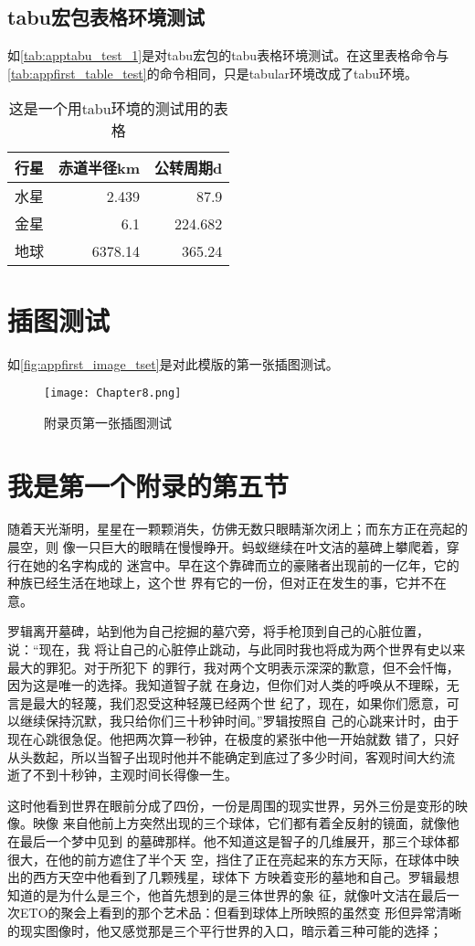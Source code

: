\subsection{tabu宏包表格环境测试}
如\autoref{tab:apptabu_test_1}是对tabu宏包的tabu表格环境测试。在这里表格命令与\autoref{tab:appfirst_table_test}的命令相同，只是tabular环境改成了tabu环境。
\begin{table}[htbp]
	\centering
	\caption{这是一个用tabu环境的测试用的表格}\label{tab:apptabu_test_1}
    \begin{tabu}{lrr}
    \toprule
    \textbf{行星}     & \textbf{赤道半径}km & \textbf{公转周期}d \\
    \midrule
    水星     & 2.439  & 87.9 \\
    金星     & 6.1    & 224.682 \\
    地球     & 6378.14 & 365.24 \\
    \bottomrule
    \end{tabu}%
\end{table}

\section{插图测试}
如\autoref{fig:appfirst_image_tset}是对此模版的第一张插图测试。

\begin{figure}[htbp]
	\centering
	\texttt{[image: Chapter8.png]}
	\caption{附录页第一张插图测试}\label{fig:appfirst_image_tset}
\end{figure}

\section{我是第一个附录的第五节}
随着天光渐明，星星在一颗颗消失，仿佛无数只眼睛渐次闭上；而东方正在亮起的晨空，则%
像一只巨大的眼睛在慢慢睁开。蚂蚁继续在叶文洁的墓碑上攀爬着，穿行在她的名字构成的%
迷宫中。早在这个靠碑而立的豪赌者出现前的一亿年，它的种族已经生活在地球上，这个世%
界有它的一份，但对正在发生的事，它并不在意。

罗辑离开墓碑，站到他为自己挖掘的墓穴旁，将手枪顶到自己的心脏位置，说：“现在，我
将让自己的心脏停止跳动，与此同时我也将成为两个世界有史以来最大的罪犯。对于所犯下
的罪行，我对两个文明表示深深的歉意，但不会忏悔，因为这是唯一的选择。我知道智子就
在身边，但你们对人类的呼唤从不理睬，无言是最大的轻蔑，我们忍受这种轻蔑已经两个世
纪了，现在，如果你们愿意，可以继续保持沉默，我只给你们三十秒钟时间。”罗辑按照自
己的心跳来计时，由于现在心跳很急促。他把两次算一秒钟，在极度的紧张中他一开始就数
错了，只好从头数起，所以当智子出现时他并不能确定到底过了多少时间，客观时间大约流
逝了不到十秒钟，主观时间长得像一生。

这时他看到世界在眼前分成了四份，一份是周围的现实世界，另外三份是变形的映像。映像%
来自他前上方突然出现的三个球体，它们都有着全反射的镜面，就像他在最后一个梦中见到%
的墓碑那样。他不知道这是智子的几维展开，那三个球体都很大，在他的前方遮住了半个天%
空，挡住了正在亮起来的东方天际，在球体中映出的西方天空中他看到了几颗残星，球体下%
方映着变形的墓地和自己。罗辑最想知道的是为什么是三个，他首先想到的是三体世界的象%
征，就像叶文洁在最后一次ETO的聚会上看到的那个艺术品：但看到球体上所映照的虽然变%
形但异常清晰的现实图像时，他又感觉那是三个平行世界的入口，暗示着三种可能的选择；
